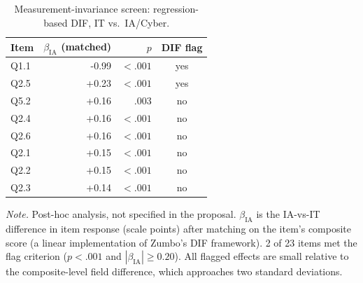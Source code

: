 \begin{table}[htbp]\centering
\caption{Measurement-invariance screen: regression-based DIF, IT vs.\ IA/Cyber.}\label{tab:invariance}
\begin{tabular}{@{}lrrc@{}}\toprule
\textbf{Item} & \textbf{$\beta_{\text{IA}}$ (matched)} & \textbf{$p$} & \textbf{DIF flag} \\ \midrule
Q1.1 & -0.99 & $<.001$ & yes \\
Q2.5 & +0.23 & $<.001$ & yes \\
Q5.2 & +0.16 & .003 & no \\
Q2.4 & +0.16 & $<.001$ & no \\
Q2.6 & +0.16 & $<.001$ & no \\
Q2.1 & +0.15 & $<.001$ & no \\
Q2.2 & +0.15 & $<.001$ & no \\
Q2.3 & +0.14 & $<.001$ & no \\
\bottomrule
\end{tabular}

\smallskip
\parbox{4.8in}{\footnotesize \textit{Note.} Post-hoc analysis, not specified in the proposal. $\beta_{\text{IA}}$ is the
IA-vs-IT difference in item response (scale points) after matching on the item's composite score
(a linear implementation of Zumbo's DIF framework). 2 of 23 items met the flag criterion ($p<.001$ and
$|\beta_{\text{IA}}| \geq 0.20$). All flagged effects are small relative to the composite-level
field difference, which approaches two standard deviations.}
\end{table}